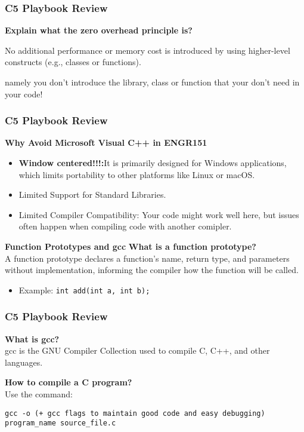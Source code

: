 \documentclass[
	11pt, %
]{beamer}
\begin{document}
\begin{frame}
	\frametitle{C5 Playbook Review}
	\textbf{Explain what the zero overhead principle is?}

	\quad No additional performance or memory cost is introduced by using higher-level constructs (e.g., classes or functions).


	\smallskip

	namely you don't introduce the library, class or function that your don't need in your code!
	
	
\end{frame}





\begin{frame}
	\frametitle{C5 Playbook Review}
	\textbf{Why Avoid Microsoft Visual C++ in ENGR151}
	\begin{itemize}
		\item \textbf{Window centered!!!:}It is primarily designed for Windows applications, which limits portability to other platforms like Linux or macOS.
		\item Limited Support for Standard Libraries.
		\item Limited Compiler Compatibility: Your code might work well here, but issues often happen when compiling code with another comipler.
	\end{itemize}
	
	
	
	\textbf{Function Prototypes and gcc}
	\textbf{What is a function prototype?} \\
	A function prototype declares a function's name, return type, and parameters without implementation, informing the compiler how the function will be called.
	\begin{itemize}
		\item Example: \texttt{int add(int a, int b);}
	\end{itemize}
	\end{frame}

	\begin{frame}
	\frametitle{C5 Playbook Review}
	\textbf{What is gcc?} \\
	gcc is the GNU Compiler Collection used to compile C, C++, and other languages.
	
	\textbf{How to compile a C program?} \\
	Use the command:
	\begin{center}
	\texttt{gcc -o (+ gcc flags to maintain good code and easy debugging) program\_name source\_file.c}
	\end{center}
	\end{frame}
	
\end{document}
